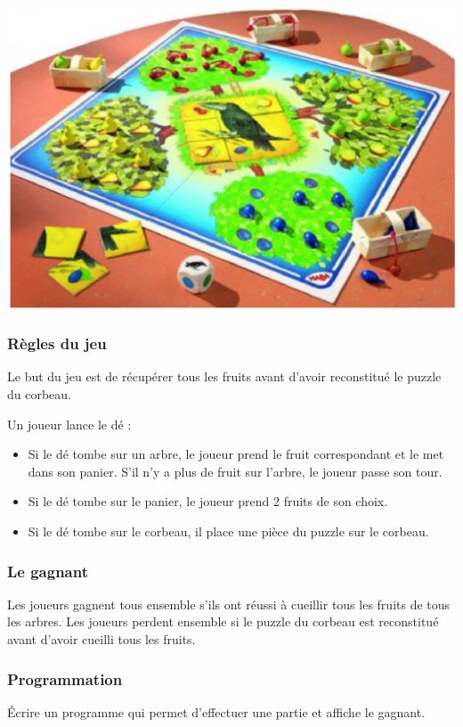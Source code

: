 \documentclass[11pt,a4paper]{article}
\begin{document}
\begin{center}
\includegraphics[scale=0.5]{img/verger.eps}
\end{center}

\subsubsection*{Règles du jeu}
Le but du jeu est de récupérer tous les fruits avant d'avoir reconstitué le puzzle du corbeau.

Un joueur lance le dé :
\begin{itemize}
\item Si le dé tombe sur un arbre, le joueur prend le fruit correspondant et le met dans son panier. S'il n'y a plus de fruit sur l'arbre, le joueur passe son tour.
\item Si le dé tombe sur le panier, le joueur prend 2 fruits de son choix.
\item Si le dé tombe sur le corbeau, il place une pièce du puzzle sur le corbeau.
\end{itemize}

\subsubsection*{Le gagnant}
Les joueurs gagnent tous ensemble s'ils ont réussi à cueillir tous les fruits de tous les arbres.
Les joueurs perdent ensemble si le puzzle du corbeau est reconstitué avant d'avoir cueilli tous les fruits.

\subsubsection*{Programmation}
Écrire un programme qui permet d'effectuer une partie et affiche le gagnant.
\end{document}

